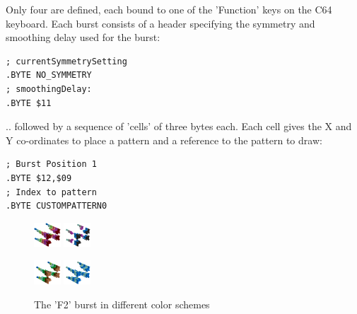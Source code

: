 Only four are defined, each bound to one of the 'Function' keys on the C64 keyboard. Each burst consists of
a header specifying the symmetry and smoothing delay used for the burst:
\begin{lstlisting}
; currentSymmetrySetting
.BYTE NO_SYMMETRY
; smoothingDelay:
.BYTE $11
\end{lstlisting}

.. followed by a sequence of 'cells' of three bytes each. Each cell gives the X and Y co-ordinates to place a pattern
and a reference to the pattern to draw:
\begin{lstlisting}
; Burst Position 1
.BYTE $12,$09
; Index to pattern 
.BYTE CUSTOMPATTERN0
\end{lstlisting}
\vfill
\begin{figure}[H]
    \centering
    \begin{adjustbox}{width=9cm,center}
      \includegraphics[width=1cm]{src/listing_commentary/diagrams/pattern1-0-45.png}%
      \includegraphics[width=1cm]{src/listing_commentary/diagrams/pattern1-1-45.png}%
    \end{adjustbox}
    \begin{adjustbox}{width=9cm,center}
      \includegraphics[width=1cm]{src/listing_commentary/diagrams/pattern1-2-45.png}%
      \includegraphics[width=1cm]{src/listing_commentary/diagrams/pattern1-3-45.png}%
    \end{adjustbox}
    \caption{The 'F2' burst in different color schemes}
\end{figure}

